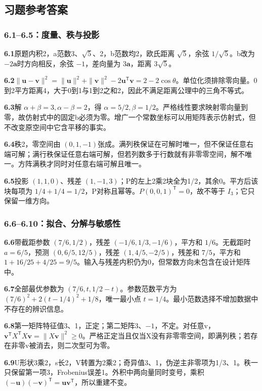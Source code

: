 \documentclass[UTF8,fontset=none,zihao=-4,a4paper]{ctexart}
\numberwithin{equation}{section}
\numberwithin{figure}{section}
\begin{document}
\clearpage
\subsection{习题参考答案}
\subsubsection*{6.1--6.5：度量、秩与投影}
\textbf{6.1}\quad 原题内积2，a范数3、$\sqrt5$、2，b范数均2，欧氏距离 $\sqrt5$，余弦 $1/\sqrt5$。b改为 $-2\symbf a$时方向相反，余弦 $-1$，差向量为 $3\symbf a$，距离 $3\sqrt5$。

\textbf{6.2}\quad $\|\symbf u-\symbf v\|^2=\|\symbf u\|^2+\|\symbf v\|^2-2\symbf u^{\mathsf T}\symbf v=2-2\cos\theta$。单位化须排除零向量。0到2平方距离4，大于0到1与1到2之和2，因此不满足距离公理中的三角不等式。

\textbf{6.3}\quad 解 $\alpha+\beta=3,\alpha-\beta=2$，得 $\alpha=5/2,\beta=1/2$。严格线性要求映射零向量到零，故仿射式中的固定b必须为零。增广一个常数坐标可以用矩阵表示仿射式，但不改变原空间中它含平移的事实。

\textbf{6.4}\quad 秩2，零空间由 $(0,1,-1)$张成。满列秩保证在可解时唯一，但不保证任意右端可解；满行秩保证任意右端可解，但若列数多于行数就有非零零空间，解不唯一。方阵满秩才同时对任意右端可解且唯一。

\textbf{6.5}\quad 投影 $(1,1,0)$、残差 $(1,-1,3)$；P的左上2乘2块全为1/2，其余0。平方后该块每项为 $1/4+1/4=1/2$，P对称且幂等。$P(0,0,1)^{\mathsf T}=0$，故不等于 $I_3$；它只保留一维方向。

\subsubsection*{6.6--6.10：拟合、分解与敏感性}
\textbf{6.6}\quad 带截距参数 $(7/6,1/2)$，残差 $(-1/6,1/3,-1/6)$，平方和 $1/6$。无截距时 $a=6/5$，预测 $(0,6/5,12/5)$，残差 $(1,4/5,-2/5)$，残差和 $7/5$，平方和 $1+16/25+4/25=9/5$。输入与残差内积仍为0，但常数方向未包含在设计矩阵中。

\textbf{6.7}\quad 全部最优参数为 $(7/6,t,1/2-t)$。参数范数平方为 $(7/6)^2+2(t-1/4)^2+1/8$，唯一最小点 $t=1/4$。最小范数选择不增加数据中不存在的辨识信息。

\textbf{6.8}\quad 第一矩阵特征值3、1，正定；第二矩阵3、$-1$，不定。对任意v，$\symbf v^{\mathsf T}X^{\mathsf T}X\symbf v=\|X\symbf v\|^2\ge0$。严格正定当且仅当X没有非零零空间，即满列秩；若存在非零v被消去，则二次型可为零。

\textbf{6.9}\quad U形状3乘2，s长2，V转置为2乘2；奇异值3、1，伪逆主非零项为1/3、1。秩一只保留第一项3，Frobenius误差1。外积中两向量同时变号，乘积 $(-\symbf u)(-\symbf v)^{\mathsf T}=\symbf u\symbf v^{\mathsf T}$，所以重建不变。
\end{document}

